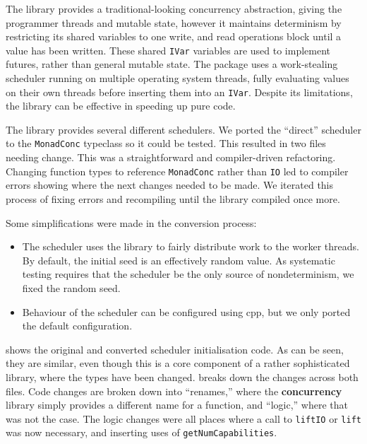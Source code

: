 The  library\cite{marlow2011} provides a
traditional-looking concurrency abstraction, giving the programmer
threads and mutable state, however it maintains determinism by
restricting its shared variables to one write, and read operations
block until a value has been written.  These shared \verb|IVar|
variables are used to implement futures, rather than general mutable
state.  The package uses a work-stealing scheduler running on multiple
operating system threads, fully evaluating values on their own threads
before inserting them into an \verb|IVar|.  Despite its limitations,
the library can be effective in speeding up pure code.

The library provides several different schedulers.  We ported the
``direct'' scheduler to the \verb|MonadConc| typeclass so it could be
tested.  This resulted in two files needing change.  This was a
straightforward and compiler-driven refactoring.  Changing function
types to reference \verb|MonadConc| rather than \verb|IO| led to
compiler errors showing where the next changes needed to be made.  We
iterated this process of fixing errors and recompiling until the
library compiled once more.

Some simplifications were made in the conversion process:

\begin{itemize}
\item The scheduler uses the  library to fairly
  distribute work to the worker threads.  By default, the initial seed
  is an effectively random value.  As systematic testing requires that
  the scheduler be the only source of nondeterminism, we fixed the
  random seed.
\item Behaviour of the scheduler can be configured using cpp, but we
  only ported the default configuration.
\end{itemize}

 shows the original and converted
scheduler initialisation code.  As can be seen, they are similar, even
though this is a core component of a rather sophisticated library,
where the types have been changed.  
breaks down the changes across both files.  Code changes are broken
down into ``renames,'' where the \textbf{concurrency} library simply
provides a different name for a function, and ``logic,'' where that
was not the case.  The logic changes were all places where a call to
\verb|liftIO| or \verb|lift| was now necessary, and inserting uses of
\verb|getNumCapabilities|.

